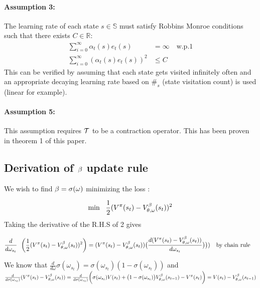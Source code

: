 \paragraph{ Assumption 3:} The learning rate of each state $s \in \mathbb{S}$ must satisfy Robbins Monroe conditions such that there exists $C \in \mathbb{R}$:
\begin{equation}
    \begin{split}
        \sum_{i=0}^{\infty} \alpha_t(s) 
e_t(s) &= \infty \quad \text{w.p.1}\\
        \sum_{i=0}^{\infty} (\alpha_t(s) e_t(s))^2 &\leq C      \end{split}
\end{equation}
This can be verified by assuming that each state gets visited infinitely often and an appropriate decaying learning rate based on $\#_s$ (state visitation count) is used (linear for example). 
\paragraph{Assumption 5:} This assumption requires $\mathcal{T}$ to be a contraction operator. This has been proven in theorem 1 of this paper.

\subsection
{Derivation of $\beta$ update rule}
\label{beta_update_rule}

We wish to find $\beta = \sigma(\omega)$ minimizing the loss : 

\begin{align}
    \min \ \ \frac{1}{2}(V^{\pi}(s_t) - V^{\beta}_{\theta,\omega}(s_t))^2  \\
\end{align}
Taking the derivative of the R.H.S of 2 gives

\begin{align}
    \frac{d}{d\omega_{s_t}} \ \ &\bigg( \frac{1}{2}(V^{\pi}(s_t) - V^{\beta}_{\theta,\omega}(s_t))^2  \bigg) =(V^{\pi}(s_t) - V^{\beta}_{\theta,\omega}(s_t)) \big(\frac{d (V^{\pi}(s_t) - V^{\beta}_{\theta,\omega}(s_t))}{d\omega_{s_t}} \big) 
     \big) )  \ \ \ \text{by chain rule}
\end{align}

We know that $\frac{d}{d\omega} \sigma(\omega_{s_t})=\sigma(\omega_{s_t})(1 - \sigma(\omega_{s_t}))$ \newline
and $\frac{d}{d\sigma(\omega_{s_t})} (V^{\pi}(s_t) - V^{\beta}_{\theta,\omega}(s_t)) = \frac{d}{d\sigma(\omega_{s_t})} \bigg(\sigma(\omega_{s_t})V(s_t) + \big(1 - \sigma(\omega_{s_t})\big)V^{\beta}_{\theta,\omega}(s_{t-1}) - V^{\pi}(s_t)\bigg) = V(s_t) - V^{\beta}_{\theta,\omega}(s_{t-1})$ \newline \newline

